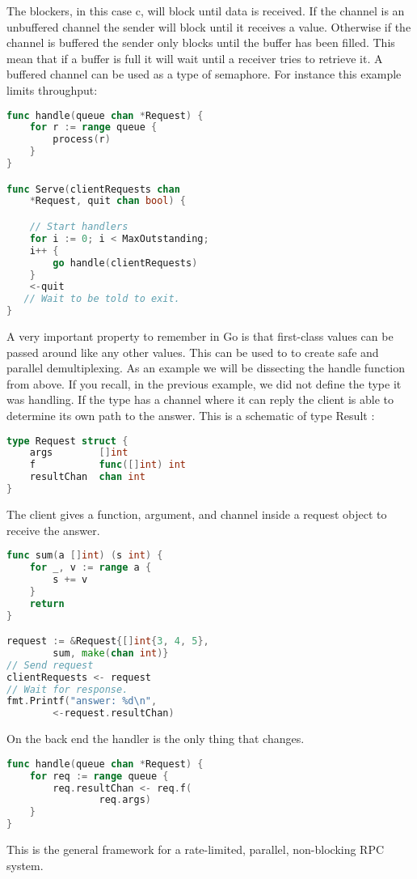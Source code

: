 The blockers, in this case c, will block until data is received. If the channel is an unbuffered channel the sender will block until it receives a value. Otherwise if the channel is buffered the sender only blocks until the buffer has been filled. This mean that if a buffer is full it will wait until a receiver tries to retrieve it. 
	A buffered channel can be used as a type of semaphore. For instance this example limits throughput:
\begin{lstlisting}[language=Go]
func handle(queue chan *Request) {
    for r := range queue {
        process(r)
    }
}

func Serve(clientRequests chan 
	*Request, quit chan bool) {

    // Start handlers
    for i := 0; i < MaxOutstanding;
    i++ {
        go handle(clientRequests)
    }
    <-quit 
   // Wait to be told to exit.
} 
\end{lstlisting}

A very important property to remember in Go is that first-class values can be passed around like any other values. This can be used to to create safe and parallel demultiplexing. As an example we will be dissecting the handle function from above. If you recall, in the previous example, we did not define the type it was handling. If the type has a channel where it can reply the client is able to determine its own path to the answer. This is a schematic of type Result :
\begin{lstlisting}[language=Go]
type Request struct {
    args        []int
    f           func([]int) int
    resultChan  chan int
} 
\end{lstlisting}
The client gives a function, argument, and channel inside a request object to receive the answer.
\begin{lstlisting}[language=Go]
func sum(a []int) (s int) {
    for _, v := range a {
        s += v
    }
    return
}

request := &Request{[]int{3, 4, 5},
	 	sum, make(chan int)}
// Send request
clientRequests <- request
// Wait for response.
fmt.Printf("answer: %d\n",
		<-request.resultChan)
\end{lstlisting}
On the back end the handler is the only thing that changes. 
\begin{lstlisting}[language=Go]
func handle(queue chan *Request) {
    for req := range queue {
        req.resultChan <- req.f(
			    req.args)
    }
} 
\end{lstlisting}
This is the general framework for a rate-limited, parallel, non-blocking RPC system.
